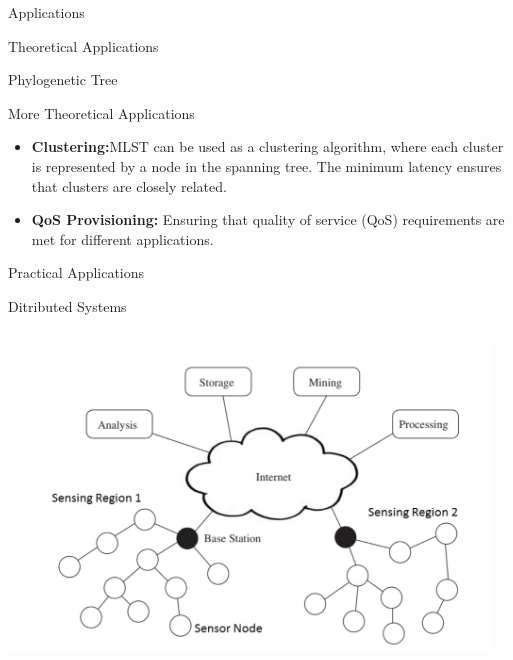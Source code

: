 \documentclass[xcolor=svgnames]{beamer}
\begin{document}
\begin{section}{Applications}
\begin{subsection}{Theoretical Applications}
\begin{frame}{Phylogenetic Tree}
    \end{frame}
        \begin{frame}{More Theoretical Applications}
            \begin{itemize}
          \item \textbf{Clustering:}\newline  MLST can be used as a clustering algorithm, where each cluster is represented by a node in the spanning tree. The minimum latency ensures that clusters are closely related.\cite{gupta2003simpler}
          \newline
          \item \textbf{QoS Provisioning: }\newline
          Ensuring that quality of service (QoS) requirements are met for different applications.\cite{swamy2004primal}
        \end{itemize}
        \end{frame}
    \end{subsection}
    \begin{subsection}{Practical Applications}
    \begin{frame}{Ditributed Systems}
    
            \begin{columns}
            
                \begin{column}{0.5\textwidth}
                    \centering
                    \includegraphics[width=\textwidth]{wns.png} %
                \end{column}
            
                \begin{column}{0.5\textwidth}
            

\end{column}
\end{columns}
\end{frame}
\end{subsection}
\end{section}
\end{document}
